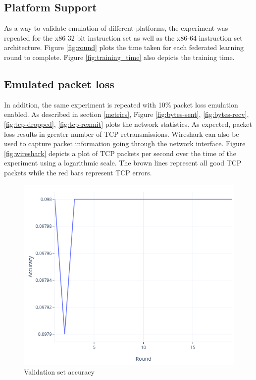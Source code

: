 \documentclass[12pt]{article}
\begin{document}
\subsection{Platform Support}
As a way to validate emulation of different platforms, the experiment was repeated for the x86 32
bit instruction set as well as the x86-64 instruction set architecture.
Figure \ref{fig:round} plots the time taken for each federated learning round to complete.
Figure \ref{fig:training_time} also depicts the training time.

\subsection{Emulated packet loss}
In addition, the same experiment is repeated with 10\% packet loss emulation enabled. As described in section \ref{metrics}, Figure \ref{fig:bytes-sent}, \ref{fig:bytes-recv},
\ref{fig:tcp-dropped}, \ref{fig:tcp-rexmit} plots the network statistics. As expected, packet loss
results in greater number of TCP retransmissions. Wireshark\cite{wireshark} can also
be used to capture packet information going through the network interface. Figure
\ref{fig:wireshark} depicts a plot of TCP packets per second over the time of the experiment using a
logarithmic scale. The brown lines represent all good TCP packets while the red bars represent TCP
errors.

\begin{figure}
  \includegraphics[width=\linewidth]{accuracy}
  \caption{Validation set accuracy}
  \label{fig:accuracy}
\end{figure}
\end{document}
